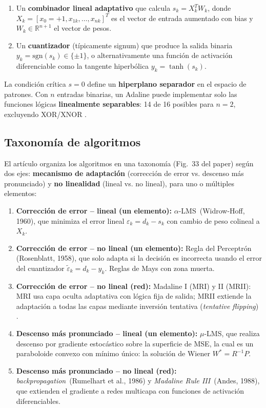 \documentclass[11pt,a4paper]{article}
\newcommand{\R}{\mathbb{R}}
\newcommand{\aLMS}{$\alpha$-LMS}
\newcommand{\muLMS}{$\mu$-LMS}
\newcommand{\bp}{\textit{backpropagation}}
\newcommand{\mriii}{\textit{Madaline Rule III}}
\begin{document}
\begin{enumerate}[leftmargin=*]
    \item Un \textbf{combinador lineal adaptativo} que calcula $s_k = X_k^T W_k$, donde
    $X_k = [x_0=+1, x_{1k}, \ldots, x_{nk}]^T$ es el vector de entrada aumentado con bias
    y $W_k \in \R^{n+1}$ el vector de pesos.
    \item Un \textbf{cuantizador} (típicamente signum) que produce la salida binaria
    $y_k = \mathrm{sgn}(s_k) \in \{\pm1\}$, o alternativamente una función de activación
    diferenciable como la tangente hiperbólica $y_k = \tanh(s_k)$.
\end{enumerate}

La condición crítica $s = 0$ define un \textbf{hiperplano separador} en el espacio de patrones.
Con $n$ entradas binarias, un Adaline puede implementar solo las funciones lógicas
\textbf{linealmente separables}: 14 de 16 posibles para $n=2$, excluyendo XOR/XNOR \cite{widrow1990}.

\subsection{Taxonomía de algoritmos}

El artículo organiza los algoritmos en una taxonomía (Fig.~33 del paper) según dos ejes:
\textbf{mecanismo de adaptación} (corrección de error vs. descenso más pronunciado) y
\textbf{no linealidad} (lineal vs. no lineal), para uno o múltiples elementos:

\begin{enumerate}[leftmargin=*]
    \item \textbf{Corrección de error -- lineal (un elemento):} \aLMS~(Widrow-Hoff, 1960),
    que minimiza el error lineal $\varepsilon_k = d_k - s_k$ con cambio de peso colineal a $X_k$.
    \item \textbf{Corrección de error -- no lineal (un elemento):} Regla del Perceptrón
    (Rosenblatt, 1958), que solo adapta si la decisión es incorrecta usando el error del
    cuantizador $\tilde{\varepsilon}_k = d_k - y_k$. Reglas de Mays con zona muerta.
    \item \textbf{Corrección de error -- no lineal (red):} Madaline I (MRI) y II (MRII):
    MRI usa capa oculta adaptativa con lógica fija de salida; MRII extiende la adaptación
    a todas las capas mediante inversión tentativa (\textit{tentative flipping}) \cite{widrow1990}.
    \item \textbf{Descenso más pronunciado -- lineal (un elemento):} \muLMS, que realiza
    descenso por gradiente estocástico sobre la superficie de MSE, la cual es un paraboloide
    convexo con mínimo único: la solución de Wiener $W^* = R^{-1}P$.
    \item \textbf{Descenso más pronunciado -- no lineal (red):} \bp~(Rumelhart et al., 1986)
    y \mriii~(Andes, 1988), que extienden el gradiente a redes multicapa con funciones de
    activación diferenciables.
\end{enumerate}
\end{document}
